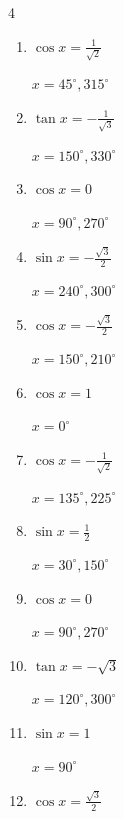 \begin{multicols}{4}
\begin{enumerate}
        $\displaystyle x = 45^{\circ} , 135^{\circ}$

  \item $\displaystyle \cos{x}  = \frac{1}{\sqrt{2}}$

        $\displaystyle x = 45^{\circ} , 315^{\circ}$

  \item $\displaystyle \tan{x}  = -\frac{1}{\sqrt{3}}$

        $\displaystyle x = 150^{\circ} , 330^{\circ}$

  \item $\displaystyle \cos{x}  = 0$

        $\displaystyle x = 90^{\circ} , 270^{\circ}$

  \item $\displaystyle \sin{x}  = -\frac{\sqrt{3}}{2}$

        $\displaystyle x = 240^{\circ} , 300^{\circ}$

  \item $\displaystyle \cos{x}  = -\frac{\sqrt{3}}{2}$

        $\displaystyle x = 150^{\circ} , 210^{\circ}$

  \item $\displaystyle \cos{x}  = 1$

        $\displaystyle x = 0^{\circ}$

  \item $\displaystyle \cos{x}  = -\frac{1}{\sqrt{2}}$

        $\displaystyle x = 135^{\circ} , 225^{\circ}$

\columnbreak %

  \item $\displaystyle \sin{x}  = \frac{1}{2}$

        $\displaystyle x = 30^{\circ} , 150^{\circ}$

  \item $\displaystyle \cos{x}  = 0$

        $\displaystyle x = 90^{\circ} , 270^{\circ}$

  \item $\displaystyle \tan{x}  = -\sqrt{3}$

        $\displaystyle x = 120^{\circ} , 300^{\circ}$

  \item $\displaystyle \sin{x}  = 1$

        $\displaystyle x = 90^{\circ}$

  \item $\displaystyle \cos{x}  = \frac{\sqrt{3}}{2}$


\end{enumerate}
\end{multicols}
